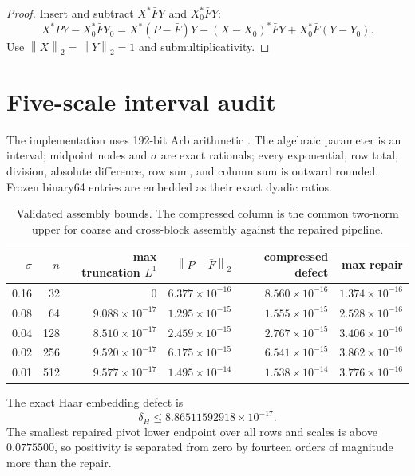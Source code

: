 \documentclass[11pt]{article}
\theoremstyle{definition}
\newcommand{\norm}[1]{\left\lVert#1\right\rVert}
\begin{document}
\begin{proof}
Insert and subtract $X^*\bar F Y$ and $X_0^*\bar F Y$:
\[
 X^*PY-X_0^*\bar F Y_0
 =X^*(P-\bar F)Y
 +(X-X_0)^*\bar F Y
 +X_0^*\bar F(Y-Y_0).
\]
Use $\norm X_2=\norm Y_2=1$ and submultiplicativity.
\end{proof}

\section{Five-scale interval audit}
\label{sec:audit}

The implementation uses 192-bit Arb arithmetic \citep{Johansson2017}.  The
algebraic parameter is an interval; midpoint nodes and $\sigma$ are exact
rationals; every exponential, row total, division, absolute difference, row
sum, and column sum is outward rounded.  Frozen binary64 entries are embedded
as their exact dyadic ratios.

\begin{table}[H]
\centering
\small
\caption{Validated assembly bounds.  The compressed column is the common
two-norm upper for coarse and cross-block assembly against the repaired
pipeline.}
\label{tab:audit}
\begin{tabular}{rrrrrr}
\toprule
$\sigma$ & $n$ & max truncation $L^1$ &
$\norm{P-\bar F}_2$ & compressed defect & max repair\\
\midrule
0.16 &  32 & $0$                    & $6.377\times10^{-16}$ & $8.560\times10^{-16}$ & $1.374\times10^{-16}$\\
0.08 &  64 & $9.088\times10^{-17}$ & $1.295\times10^{-15}$ & $1.555\times10^{-15}$ & $2.528\times10^{-16}$\\
0.04 & 128 & $8.510\times10^{-17}$ & $2.459\times10^{-15}$ & $2.767\times10^{-15}$ & $3.406\times10^{-16}$\\
0.02 & 256 & $9.520\times10^{-17}$ & $6.175\times10^{-15}$ & $6.541\times10^{-15}$ & $3.862\times10^{-16}$\\
0.01 & 512 & $9.577\times10^{-17}$ & $1.495\times10^{-14}$ & $1.538\times10^{-14}$ & $3.776\times10^{-16}$\\
\bottomrule
\end{tabular}
\end{table}

The exact Haar embedding defect is
\[
 \delta_H\le8.86511592918\times10^{-17}.
\]
The smallest repaired pivot lower endpoint over all rows and scales is above
$0.0775500$, so positivity is separated from zero by fourteen orders of
magnitude more than the repair.
\end{document}
